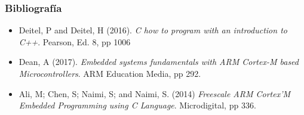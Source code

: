 \documentclass[10.5pt,scale=1.0,t,aspectratio=169,hyperref={pdfpagelabels=false}]{beamer}
\begin{document}
\begin{frame}
	\frametitle{Bibliografía}
	\begin{itemize}
		\item Deitel, P and Deitel, H (2016). \textit{C how to program with an introduction to C++}. Pearson, Ed. 8, pp 1006
		\item Dean, A (2017). \textit{Embedded systems fundamentals with ARM Cortex-M based Microcontrollers}. ARM Education Media, pp 292.
		\item Ali, M; Chen, S; Naimi, S; and Naimi, S. (2014) \textit{Freescale ARM Cortex'M Embedded Programming using C Language}. Microdigital, pp 336.
	\end{itemize}
\end{frame}
%
%
%
\end{document}
